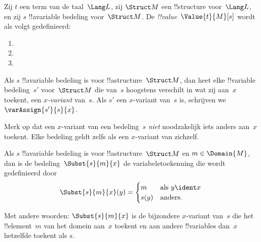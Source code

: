 \documentclass[openany]{memoir}
\begin{document}
\begin{defn}
Zij $t$ een term van de taal~$\Lang L$, zij $\Struct M$ een
!!{structure} voor~$\Lang L$, en zij $s$ !!a{variable} bedeling
voor~$\Struct M$. De \emph{!!{value}}~$\Value{t}{M}[s]$ wordt als
volgt gedefinieerd:
\begin{enumerate}
\item {}
\item {}
\item {}
\end{enumerate}
\end{defn}

\begin{defn}[$x$-variant]
Als $s$ !!a{variable} bedeling is voor !!a{structure}~$\Struct M$, dan heet
elke !!{variable} bedeling~$s'$ voor~$\Struct M$ die van~$s$ hoogstens
verschilt in wat zij aan~$x$ toekent, een \emph{$x$-variant} van~$s$. Als
$s'$ een $x$-variant van~$s$ is, schrijven we $\varAssign{s'}{s}{x}$.
\end{defn}

\begin{explain}
Merk op dat een $x$-variant van een bedeling~$s$ \emph{niet} noodzakelijk iets
anders aan~$x$ toekent. Elke bedeling geldt zelfs als een $x$-variant
van zichzelf.
\end{explain}

\begin{defn}
  Als $s$ !!a{variable} bedeling is voor !!a{structure}~$\Struct M$
  en $m \in \Domain{M}$, dan is de bedeling~$\Subst{s}{m}{x}$ de
  variabeletoekenning die wordt gedefinieerd door
  \[\Subst{s}{m}{x}(y) = \begin{cases}
    m & \text{als } y \ident x\\
    s(y) & \text{anders}.
  \end{cases}\]
\end{defn}

Met andere woorden: $\Subst{s}{m}{x}$ is de bijzondere $x$-variant van~$s$
die het !!{element}~$m$ van het domein aan~$x$ toekent en aan andere
!!{variable}s dan~$x$ hetzelfde toekent als $s$.
\end{document}

